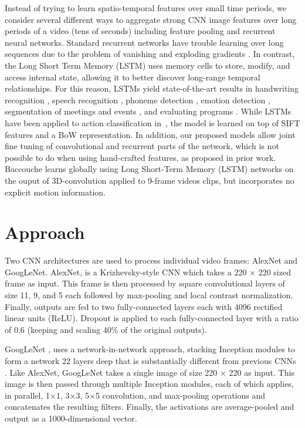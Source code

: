 \documentclass[10pt,twocolumn,letterpaper]{article}
\begin{document}
Instead of trying to learn spatio-temporal features over small time
periods, we consider several different ways to aggregate strong CNN
image features over long periods of a video (tens of seconds)
including feature pooling and recurrent neural networks. Standard
recurrent networks have trouble learning over long sequences due to
the problem of vanishing and exploding gradients
\cite{bengio94learning}.
In contrast, the Long Short Term Memory
(LSTM) \cite{hochreiter97long} uses memory cells to store, modify, and
access internal state, allowing it to better discover long-range
temporal relationships. For this reason, LSTMs yield state-of-the-art
results in handwriting recognition \cite{graves09novel,
  graves08offline}, speech recognition \cite{graves13speech,
  graves14towards}, phoneme detection \cite{fernandez08phoneme},
emotion detection \cite{wollmer13lstm}, segmentation of meetings and
events \cite{reiter06combined}, and evaluating programs
\cite{zaremba14learning}. While LSTMs have been applied to action
classification in~\cite{Baccouche2010}, the model is learned on top of
SIFT features and a BoW representation. In addition, our proposed
models allow joint fine tuning of convolutional and recurrent parts of
the network, which is not possible to do when using hand-crafted
features, as proposed in prior work. Baccouche \etal\cite{Baccouche2010} learns globally using Long Short-Term Memory
(LSTM) networks on the ouput of 3D-convolution applied to 9-frame
videos clips, but incorporates no explicit motion information.


%
\section{Approach}\vspace{-1em}\label{sec:approach}%
Two CNN architectures are used to process individual video frames:
AlexNet and GoogLeNet. AlexNet, is a Krizhevsky-style CNN
\cite{krizhevsky2012imagenet} which takes a 220 $\times$ 220 sized
frame as input. This frame is then processed by square convolutional layers
of size 11, 9, and 5 each followed by max-pooling and local
contrast normalization. Finally, outputs are fed to two fully-connected layers
each with 4096 rectified linear units (ReLU).
 Dropout is applied to each fully-connected layer with a ratio of
 0.6 (keeping and scaling 40\% of the original outputs).


GoogLeNet \cite{szegedy14going}, uses a network-in-network approach,
stacking Inception modules to form a network 22 layers deep that is
substantially different from previous CNNs
\cite{krizhevsky2012imagenet, zeiler13visualizing}. Like AlexNet,
GoogLeNet takes a single image of size 220 $\times$ 220 as input. This
image is then passed through multiple Inception modules, each of which
applies, in parallel, 1$\times$1, 3$\times$3, 5$\times$5 convolution,
and max-pooling operations and concatenates the resulting
filters. Finally, the activations are average-pooled and output as a
1000-dimensional vector.
\end{document}
